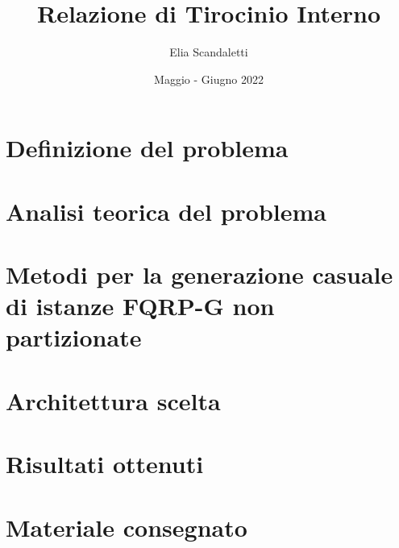 

\title{Relazione di Tirocinio Interno}
\author{Elia Scandaletti}
\date{Maggio - Giugno 2022}



\maketitle
\tableofcontents

\section{Definizione del problema}


\section{Analisi teorica del problema}


\section{Metodi per la generazione casuale di istanze FQRP-G non partizionate}


\section{Architettura scelta}


\section{Risultati ottenuti}


\section{Materiale consegnato}


